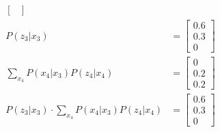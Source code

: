 \documentclass[answers]{exam}
\begin{document}
\begin{questions}
\begin{parts}
\begin{solution}
\begin{align*}
\begin{bmatrix}
                                                                                                                    \end{bmatrix}                                                                                                                                                                                                          \\
                P(z_3 | x_3)                                                                                    & = \begin{bmatrix}
                                                                                                                        0.6 \\
                                                                                                                        0.3 \\
                                                                                                                        0
                                                                                                                    \end{bmatrix}                                                                                                                                                                                                          \\
                \sum_{x_4} P(x_4 | x_3) P(z_4 | x_4)                                                            & = \begin{bmatrix} 0 \\ 0.2 \\ 0.2 \end{bmatrix}                                                                                                                                                                           \\
                P(z_3 | x_3) \cdot \sum_{x_4} P(x_4 | x_3) P(z_4 | x_4)                                         & = \begin{bmatrix}
                                                                                                                        0.6 \\
                                                                                                                        0.3 \\
                                                                                                                        0

\end{bmatrix}
\end{align*}
\end{solution}
\end{parts}
\end{questions}
\end{document}
